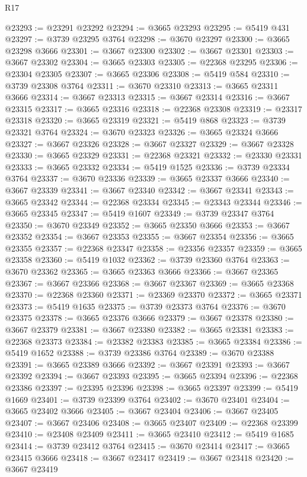 \begin{lexlean}{R17}
\begin{coremodule}
@23293 := @23291 @23292
@23294 := @3665 @23293
@23295 := @5419 @431
@23297 := @3739 @23295 @3764
@23298 := @3670 @23297
@23300 := @3665 @23298 @3666
@23301 := @3667 @23300
@23302 := @3667 @23301
@23303 := @3667 @23302
@23304 := @3665 @23303
@23305 := @22368 @23295
@23306 := @23304 @23305
@23307 := @3665 @23306
@23308 := @5419 @584
@23310 := @3739 @23308 @3764
@23311 := @3670 @23310
@23313 := @3665 @23311 @3666
@23314 := @3667 @23313
@23315 := @3667 @23314
@23316 := @3667 @23315
@23317 := @3665 @23316
@23318 := @22368 @23308
@23319 := @23317 @23318
@23320 := @3665 @23319
@23321 := @5419 @868
@23323 := @3739 @23321 @3764
@23324 := @3670 @23323
@23326 := @3665 @23324 @3666
@23327 := @3667 @23326
@23328 := @3667 @23327
@23329 := @3667 @23328
@23330 := @3665 @23329
@23331 := @22368 @23321
@23332 := @23330 @23331
@23333 := @3665 @23332
@23334 := @5419 @1525
@23336 := @3739 @23334 @3764
@23337 := @3670 @23336
@23339 := @3665 @23337 @3666
@23340 := @3667 @23339
@23341 := @3667 @23340
@23342 := @3667 @23341
@23343 := @3665 @23342
@23344 := @22368 @23334
@23345 := @23343 @23344
@23346 := @3665 @23345
@23347 := @5419 @1607
@23349 := @3739 @23347 @3764
@23350 := @3670 @23349
@23352 := @3665 @23350 @3666
@23353 := @3667 @23352
@23354 := @3667 @23353
@23355 := @3667 @23354
@23356 := @3665 @23355
@23357 := @22368 @23347
@23358 := @23356 @23357
@23359 := @3665 @23358
@23360 := @5419 @1032
@23362 := @3739 @23360 @3764
@23363 := @3670 @23362
@23365 := @3665 @23363 @3666
@23366 := @3667 @23365
@23367 := @3667 @23366
@23368 := @3667 @23367
@23369 := @3665 @23368
@23370 := @22368 @23360
@23371 := @23369 @23370
@23372 := @3665 @23371
@23373 := @5419 @1635
@23375 := @3739 @23373 @3764
@23376 := @3670 @23375
@23378 := @3665 @23376 @3666
@23379 := @3667 @23378
@23380 := @3667 @23379
@23381 := @3667 @23380
@23382 := @3665 @23381
@23383 := @22368 @23373
@23384 := @23382 @23383
@23385 := @3665 @23384
@23386 := @5419 @1652
@23388 := @3739 @23386 @3764
@23389 := @3670 @23388
@23391 := @3665 @23389 @3666
@23392 := @3667 @23391
@23393 := @3667 @23392
@23394 := @3667 @23393
@23395 := @3665 @23394
@23396 := @22368 @23386
@23397 := @23395 @23396
@23398 := @3665 @23397
@23399 := @5419 @1669
@23401 := @3739 @23399 @3764
@23402 := @3670 @23401
@23404 := @3665 @23402 @3666
@23405 := @3667 @23404
@23406 := @3667 @23405
@23407 := @3667 @23406
@23408 := @3665 @23407
@23409 := @22368 @23399
@23410 := @23408 @23409
@23411 := @3665 @23410
@23412 := @5419 @1685
@23414 := @3739 @23412 @3764
@23415 := @3670 @23414
@23417 := @3665 @23415 @3666
@23418 := @3667 @23417
@23419 := @3667 @23418
@23420 := @3667 @23419

\end{coremodule}
\end{lexlean}
